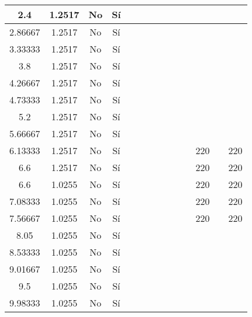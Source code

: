 \begin{table}[H]
{\begin{tabular}{|c|c|c|c|c|c|c|c|c|c|c|c|c|c|}
\hline
2.4 & 1.2517 & No  & Sí  &     &     &     &     &     &     &     &     &     &  \bigstrut\\
\hline
2.86667 & 1.2517 & No  & Sí  &     &     &     &     &     &     &     &     &     &  \bigstrut\\
\hline
3.33333 & 1.2517 & No  & Sí  &     &     &     &     &     &     &     &     &     &  \bigstrut\\
\hline
3.8 & 1.2517 & No  & Sí  &     &     &     &     &     &     &     &     &     &  \bigstrut\\
\hline
4.26667 & 1.2517 & No  & Sí  &     &     &     &     &     &     &     &     &     &  \bigstrut\\
\hline
4.73333 & 1.2517 & No  & Sí  &     &     &     &     &     &     &     &     &     &  \bigstrut\\
\hline
5.2 & 1.2517 & No  & Sí  &     &     &     &     &     &     &     &     &     &  \bigstrut\\
\hline
5.66667 & 1.2517 & No  & Sí  &     &     &     &     &     &     &     &     &     &  \bigstrut\\
\hline
6.13333 & 1.2517 & No  & Sí  &     &     &     &     &     &     &     & 220 &     & 220 \bigstrut\\
\hline
6.6 & 1.2517 & No  & Sí  &     &     &     &     &     &     &     & 220 &     & 220 \bigstrut\\
\hline
6.6 & 1.0255 & No  & Sí  &     &     &     &     &     &     &     & 220 &     & 220 \bigstrut\\
\hline
7.08333 & 1.0255 & No  & Sí  &     &     &     &     &     &     &     & 220 &     & 220 \bigstrut\\
\hline
7.56667 & 1.0255 & No  & Sí  &     &     &     &     &     &     &     & 220 &     & 220 \bigstrut\\
\hline
8.05 & 1.0255 & No  & Sí  &     &     &     &     &     &     &     &     &     &  \bigstrut\\
\hline
8.53333 & 1.0255 & No  & Sí  &     &     &     &     &     &     &     &     &     &  \bigstrut\\
\hline
9.01667 & 1.0255 & No  & Sí  &     &     &     &     &     &     &     &     &     &  \bigstrut\\
\hline
9.5 & 1.0255 & No  & Sí  &     &     &     &     &     &     &     &     &     &  \bigstrut\\
\hline
9.98333 & 1.0255 & No  & Sí  &     &     &     &     &     &     &     &     &     &  \bigstrut\\
\hline

\end{tabular}}
\end{table}
